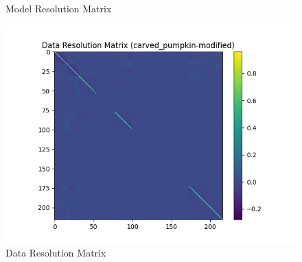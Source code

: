 \documentclass{article}
\begin{document}
\begin{itemize}
\begin{figure}[h]
    \caption{Model Resolution Matrix}
\end{figure}
\begin{figure}[h]
    \centering
    \includegraphics[width=1\textwidth]{images/outputs/datares/carved_pumpkin-modified.png}
    \caption{Data Resolution Matrix}
\end{figure}
\clearpage



\end{itemize}
\end{document}
